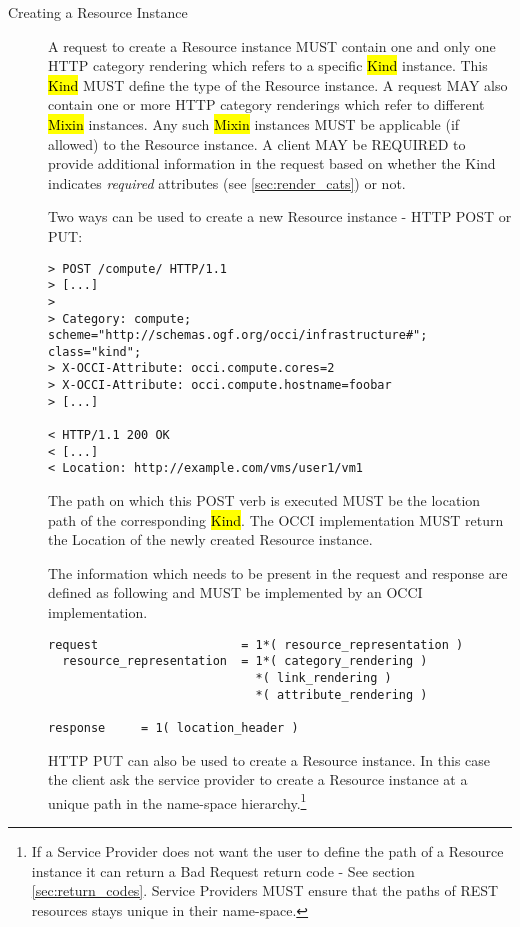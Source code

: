 \documentclass[10pt,a4paper]{article}
\begin{document}
\begin{description}
  \item[Creating a Resource Instance] A request to create a Resource
    instance MUST contain one and only one HTTP category rendering
    which refers to a specific \hl{Kind} instance. This \hl{Kind}
    MUST define the type of the Resource instance.  A request 
    MAY also contain one or more HTTP category
    renderings which refer to different \hl{Mixin} instances. Any such
    \hl{Mixin} instances MUST be applicable (if allowed) to the
    Resource instance.  A client MAY be REQUIRED to provide additional
    information in the request based on whether the Kind indicates 
    \emph{required} attributes (see \ref{sec:render_cats}) or not.
    
    Two ways can be used to create a new Resource instance - HTTP POST or PUT:

\begin{verbatim}
> POST /compute/ HTTP/1.1
> [...]
> 
> Category: compute; scheme="http://schemas.ogf.org/occi/infrastructure#"; class="kind"; 
> X-OCCI-Attribute: occi.compute.cores=2
> X-OCCI-Attribute: occi.compute.hostname=foobar
> [...]
 
< HTTP/1.1 200 OK
< [...]
< Location: http://example.com/vms/user1/vm1
\end{verbatim}

    The path on which this POST verb is executed MUST be the location
    path of the corresponding \hl{Kind}. The OCCI
    implementation MUST return the Location of the newly created
    Resource instance.

    The information which needs to be present in the request and
    response are defined as following and MUST be implemented by an
    OCCI implementation.

\begin{verbatim}
request                    = 1*( resource_representation )
  resource_representation  = 1*( category_rendering )
                             *( link_rendering )
                             *( attribute_rendering )

response     = 1( location_header )
\end{verbatim}

    HTTP PUT can also be used to create a Resource instance. In this
    case the client ask the service provider to create a Resource
    instance at a unique path in the name-space
    hierarchy.\footnote{If a Service Provider does not want the user
      to define the path of a Resource instance it can return a Bad
      Request return code - See section
      \ref{sec:return_codes}. Service Providers MUST ensure that the
      paths of REST resources stays unique in their name-space.}


\end{description}
\end{document}
